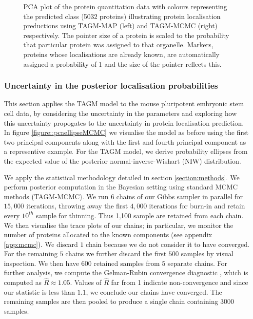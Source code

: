 \documentclass[12pt,english]{article}\usepackage[]{graphicx}\usepackage[]{color}
\newenvironment{knitrout}{}{} %
\begin{document}
\begin{figure}[ht]
\begin{subfigure}[t]{0.5\textwidth}
\begin{knitrout}
\end{knitrout}
    \end{subfigure}%
  \centering
  \caption{PCA plot of the protein quantitation data with colours
    representing the predicted class (5032 proteins) illustrating
    protein localisation preductions using TAGM-MAP (left) and
    TAGM-MCMC (right) respectively. The pointer size of a protein is
    scaled to the probability that particular protein was assigned to
    that organelle. Markers, proteins whose localisations are already
    known, are automatically assigned a probability of $1$ and the
    size of the pointer reflects this.}
  \label{fig:assignmentPCA} %
\end{figure}


\subsubsection*{Uncertainty in the posterior localisation probabilities}

This section applies the TAGM model to the mouse pluripotent embryonic
stem cell data, by considering the uncertainty in the parameters and
exploring how this uncertainty propogates to the uncertainty in
protein localisation prediction.  In figure
\ref{figure::pcaellipseMCMC} we visualise the model as before using
the first two principal components along with the first and fourth
principal component as a representive example.  For the TAGM model, we
derive probability ellipses from the expected value of the posterior
normal-inverse-Wishart (NIW) distribution.

We apply the statistical methodology detailed in section
\ref{section:methods}.  We perform posterior computation in the
Bayesian setting using standard MCMC methods (TAGM-MCMC).  We run $6$
chains of our Gibbs sampler in parallel for $15,000$ iterations,
throwing away the first $4,000$ iterations for burn-in and retain
every $10^{th}$ sample for thinning.  Thus 1,100 sample are retained
from each chain. We then visualise the trace plots of our chains; in
particular, we monitor the number of proteins allocated to the known
components (see appendix \ref{app:mcmc}). We discard $1$ chain because
we do not consider it to have converged.  For the remaining $5$
chains we further discard the first $500$ samples by visual
inspection.  We then have $600$ retained samples from $5$ separate
chains. For further analysis, we compute the Gelman-Rubin convergence
diagnostic \citep{Gelman:1992, Brooks:1998}, which is computed as
$\hat{R} \approx 1.05$.  Values of $\hat{R}$ far from 1 indicate
non-convergence and since our statistic is less than $1.1$, we
conclude our chains have converged. The remaining samples are then
pooled to produce a single chain containing $3000$ samples.
\end{document}
